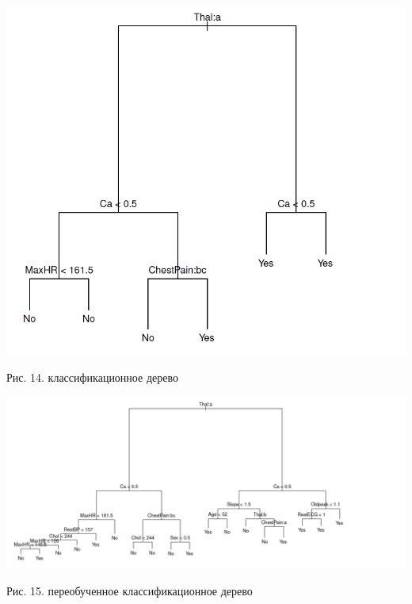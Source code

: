 \documentclass{article}
\begin{document}
\begin{center}
	\includegraphics[scale=0.3]{pic71}
\end{center}
\begin{center}
	Рис. 14. классификационное дерево
\end{center}
\begin{center}
	\includegraphics[scale=0.3]{pic72}
\end{center}
\begin{center}
	Рис. 15. переобученное классификационное дерево
\end{center}
\end{document}
